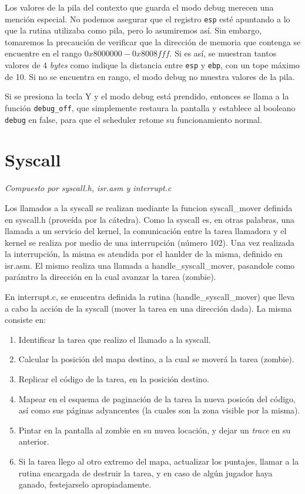 \documentclass{article}
\begin{document}
	Los valores de la pila del contexto que guarda el modo debug merecen una mención especial. No
    podemos asegurar que el registro \texttt{esp} esté apuntando a lo que la rutina utilizaba como
    pila, pero lo asumiremos así. Sin embargo, tomaremos la precaución de verificar que la dirección
    de memoria que contenga se encuentre en el rango $0x8000000 - 0x8008fff$. Si es así, se muestran tantos valores de 4 \textit{bytes} como indique la distancia entre \texttt{esp} y \texttt{ebp}, con un tope máximo de 10. Si no se encuentra en rango, el modo debug no muestra valores de la pila.

	Si se presiona la tecla Y y el modo debug está prendido, entonces se llama a la función \texttt{debug\_off}, que simplemente restaura la pantalla y establece al booleano \texttt{debug} en false, para que el scheduler retome su funcionamiento normal.


	\section{Syscall}
	\vspace{-1cm}
	\begin{flushright}
		\textit{Compuesto por syscall.h, isr.asm y interrupt.c}
	\end{flushright}
    Los llamados a la syscall se realizan mediante la funcion syscall\_mover definida en syscall.h
    (proveída por la cátedra). Como la syscall es, en otras palabras, una llamada a un servicio del
    kernel, la comunicación entre la tarea llamadora y el kernel se realiza por medio de una
    interrupción (número 102). Una vez realizada la interrupción, la misma es atendida por el
    hanlder de la misma, definido en isr.asm. El mismo realiza una llamada a handle\_syscall\_mover,
    pasandole como parámtro la dirección en la cual avanzar la tarea (zombie).

    En interrupt.c, se enucentra definida la rutina (handle\_syscall\_mover) que lleva a cabo la acción de la syscall (mover
    la tarea en una dirección dada). La misma consiste en:
    \begin{enumerate}
        \item Identificar la tarea que realizo el llamado a la syscall.
        \item Calcular la posición del mapa destino, a la cual se moverá la tarea (zombie).
        \item Replicar el código de la tarea, en la posición destino.
        \item Mapear en el esquema de paginación de la tarea la nueva posicón del código, así como
            sus páginas adyancentes (la cuales son la zona visible por la misma).
        \item Pintar en la pantalla al zombie en su nuvea locación, y dejar un \textit{trace} en su
            anterior.
        \item Si la tarea llego al otro extremo del mapa, actualizar los puntajes, llamar a la
            rutina encargada de destruir la tarea, y en caso de algún jugador haya ganado,
            festejarselo apropiadamente.
    \end{enumerate}
    
\end{document}
